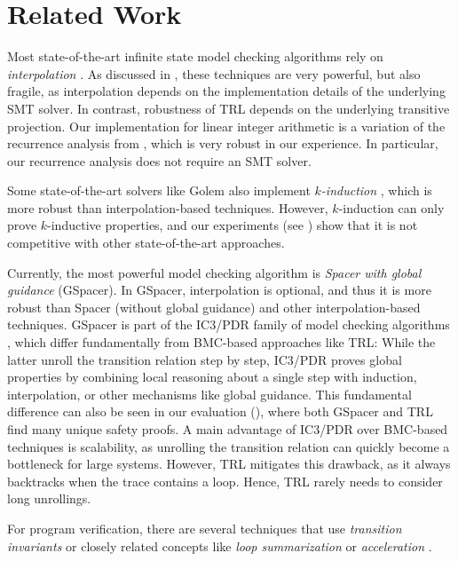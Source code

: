 \section{Related Work}
\label{sec:related}

Most state-of-the-art infinite state model checking algorithms rely on \emph{interpolation} \cite{spacer,gspacer,tpa-multiloop,imc,lawi,eldarica,pdkind,chatterjee24}.
%
As discussed in , these techniques are very powerful, but also fragile, as interpolation depends on the implementation details of the underlying SMT solver.
%
In contrast, robustness of TRL depends on the underlying transitive projection.
%
Our implementation for linear integer arithmetic is a variation of the recurrence analysis from \cite{kincaid15}, which is very robust in our experience.
%
In particular, our recurrence analysis does not require an SMT solver.

Some state-of-the-art solvers like \textsf{Golem} \cite{golem} also implement \emph{$k$-induction} \cite{kind}, which is more robust than interpolation-based techniques.
%
However, $k$-induction can only prove $k$-inductive properties, and our experiments (see ) show that it is not competitive with other state-of-the-art approaches.

Currently, the most powerful model checking algorithm is \emph{Spacer with global guidance} (GSpacer).
%
In GSpacer, interpolation is optional, and thus it is more robust than Spacer (without global guidance) and other interpolation-based techniques.
%
GSpacer is part of the IC3/PDR family of model checking algorithms \cite{ic3}, which differ fundamentally from BMC-based approaches like TRL:
%
While the latter unroll the transition relation step by step, IC3/PDR proves global properties by combining local reasoning about a single step with induction, interpolation, or other mechanisms like global guidance.
%
This fundamental difference can also be seen in our evaluation (), where both GSpacer and TRL find many unique safety proofs.
%
A main advantage of IC3/PDR over BMC-based techniques is scalability, as unrolling the transition relation can quickly become a bottleneck for large systems.
%
However, TRL mitigates this drawback, as it always backtracks when the trace contains a loop.
%
Hence, TRL rarely needs to consider long unrollings.

For program verification, there are several techniques that use \emph{transition invariants} or closely related concepts like \emph{loop summarization} or \emph{acceleration} \cite{kincaid15,kroening15,abmc,adcl,silverman19,kincaid24,kroening13,bozga10,FlatFramework}.

